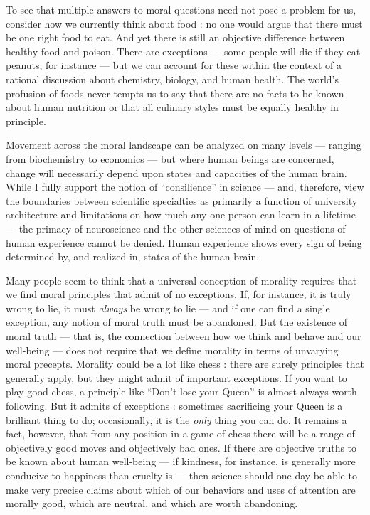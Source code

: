 \documentclass[a4paper,14pt]{extarticle}
\begin{document}
To see that multiple answers to moral questions need not pose a problem for us, consider how we currently think about food :
no one would argue that there must be one right food to eat.
And yet there is still an objective difference between healthy food and poison.
There are exceptions --- some people will die if they eat peanuts, for instance --- but we can account for these within the context of a rational discussion about chemistry, biology, and human health.
The world's profusion of foods never tempts us to say that there are no facts to be known about human nutrition or that all culinary styles must be equally healthy in principle.

Movement across the moral landscape can be analyzed on many levels --- ranging from biochemistry to economics --- but where human beings are concerned, change will necessarily depend upon states and capacities of the human brain.
While I fully support the notion of ``consilience'' in science --- and, therefore, view the boundaries between scientific specialties as primarily a function of university architecture and limitations on how much any one person can learn in a lifetime --- the primacy of neuroscience and the other sciences of mind on questions of human experience cannot be denied.
Human experience shows every sign of being determined by, and realized in, states of the human brain.

Many people seem to think that a universal conception of morality requires that we find moral principles that admit of no exceptions.
If, for instance, it is truly wrong to lie, it must \textit{always} be wrong to lie --- and if one can find a single exception, any notion of moral truth must be abandoned.
But the existence of moral truth --- that is, the connection between how we think and behave and our well-being --- does not require that we define morality in terms of unvarying moral precepts.
Morality could be a lot like chess :
there are surely principles that generally apply, but they might admit of important exceptions.
If you want to play good chess, a principle like ``Don't lose your Queen'' is almost always worth following.
But it admits of exceptions :
sometimes sacrificing your Queen is a brilliant thing to do;
occasionally, it is the \textit{only} thing you can do.
It remains a fact, however, that from any position in a game of chess there will be a range of objectively good moves and objectively bad ones.
If there are objective truths to be known about human well-being --- if kindness, for instance, is generally more conducive to happiness than cruelty is --- then science should one day be able to make very precise claims about which of our behaviors and uses of attention are morally good, which are neutral, and which are worth abandoning.
\end{document}
